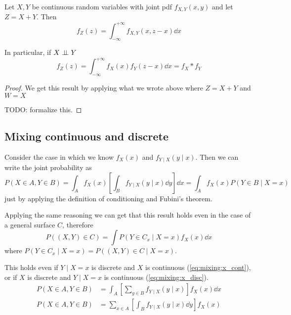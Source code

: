 \documentclass[12pt]{extarticle}
\begin{document}
\begin{theorem}
    Let $X, Y$ be continuous random variables with joint pdf $f_{X, Y}(x, y)$ and let $Z = X + Y$.
    Then
    \begin{equation}
        f_Z(z) = \int_{-\infty}^{+\infty} f_{X, Y} (x, z-x) \dd{x}
    \end{equation}

    In particular, if $X \perp \!\!\! \perp Y$
    \begin{equation}
        f_Z(z) = \int_{-\infty}^{+\infty} f_X(x) f_Y(z-x) \dd{x} = f_X \ast f_Y
    \end{equation}
\end{theorem}

\begin{proof}
    We get this result by applying what we wrote above where $Z = X + Y$ and $W = X$

    TODO: formalize this.
\end{proof}

\subsection{Mixing continuous and discrete}

Consider the case in which we know $f_X(x)$ and $f_{Y \mid X}(y \mid x)$.
Then we can write the joint probability as
\begin{equation}
    P(X\in A, Y \in B) = \int_A f_X(x) \left[\int_B f_{Y \mid X}(y \mid x) \dd{y} \right] \dd{x} = \int_A f_X(x) P(Y\in B \mid  X = x)
\end{equation}
just by applying the definition of conditioning and Fubini's theorem.

Applying the same reasoning we can get that this result holds even in the case of a general surface $C$, therefore
\begin{equation}
    P((X, Y) \in C) = \int P(Y \in C_x  \mid  X = x) f_X(x) \dd{x}
\end{equation}
where $P(Y \in C_x  \mid  X = x) = P((X, Y) \in C  \mid  X = x)$.

This holds even if $Y \mid X = x$ is discrete and $X$ is continuous (\autoref{eq:mixing:x_cont}), or if $X$ is discrete and $Y \mid X = x$ is continuous (\autoref{eq:mixing:x_disc}).
\begin{align}
    P(X \in A, Y \in B) & = \int_A \left[\sum_{y \in B} f_{Y  \mid  X}(y \mid  x)\right] f_X(x) \dd{x} \label{eq:mixing:x_cont} \\
    P(X \in A, Y \in B) & = \sum_{x \in A} \left[ \int_B f_{Y \mid X}(y \mid x) \dd{y} \right] f_X(x) \label{eq:mixing:x_disc}
\end{align}
\end{document}

